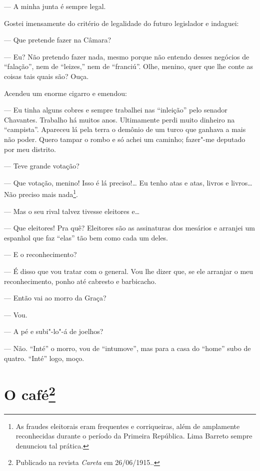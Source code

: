 --- A minha junta é sempre legal.

Gostei imensamente do critério de legalidade do futuro legislador e
indaguei:

--- Que pretende fazer na Câmara?

--- Eu? Não pretendo fazer nada, mesmo porque não entendo desses negócios
de ``falação'', nem de ``leizes,'' nem de ``franciú''. Olhe, menino,
quer que lhe conte as coisas tais quais são? Ouça.

Acendeu um enorme cigarro e emendou:

--- Eu tinha alguns cobres e sempre trabalhei nas ``inleição'' pelo
senador Chavantes. Trabalho há muitos anos. Ultimamente perdi muito
dinheiro na ``campista''. Apareceu lá pela terra o demônio de um turco
que ganhava a mais não poder. Quero tampar o rombo e só achei um
caminho; fazer"-me deputado por meu distrito.

--- Teve grande votação?

--- Que votação, menino! Isso é lá preciso!\ldots{} Eu tenho atas e atas,
livros e livros\ldots{} Não preciso mais nada\footnote{As fraudes eleitorais
  eram frequentes e corriqueiras, além de amplamente reconhecidas
  durante o período da Primeira República. Lima Barreto sempre denunciou
  tal prática.}.

--- Mas o seu rival talvez tivesse eleitores e\ldots{}

--- Que eleitores! Pra quê? Eleitores são as assinaturas dos mesários e
arranjei um espanhol que faz ``elas'' tão bem como cada um deles.

--- E o reconhecimento?

--- É disso que vou tratar com o general. Vou lhe dizer que, se ele
arranjar o meu reconhecimento, ponho até cabresto e barbicacho.

--- Então vai ao morro da Graça?

--- Vou.

--- A pé e subi"-lo"-á de joelhos?

--- Não. ``Inté'' o morro, vou de ``intumove'', mas para a casa do
``home'' subo de quatro. ``Inté'' logo, moço.



\chapter[O café]{O café\footnote[*]{Publicado na revista \emph{Careta} em 26/06/1915..}}

